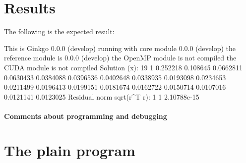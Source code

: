 \section*{Results}

The following is the expected result\+:


\begin{DoxyCode}
This is Ginkgo 0.0.0 (develop)
    running with core module 0.0.0 (develop)
    the reference module is  0.0.0 (develop)
    the OpenMP    module is  not compiled
    the CUDA      module is  not compiled
Solution (x):
19 1
0.252218
0.108645
0.0662811
0.0630433
0.0384088
0.0396536
0.0402648
0.0338935
0.0193098
0.0234653
0.0211499
0.0196413
0.0199151
0.0181674
0.0162722
0.0150714
0.0107016
0.0121141
0.0123025
Residual norm sqrt(r^T r):
1 1
2.10788e-15
\end{DoxyCode}


\label{_Commentsaboutprogramminganddebugging}%
\paragraph*{Comments about programming and debugging }

\label{_PlainProg}%
 \section*{The plain program}


